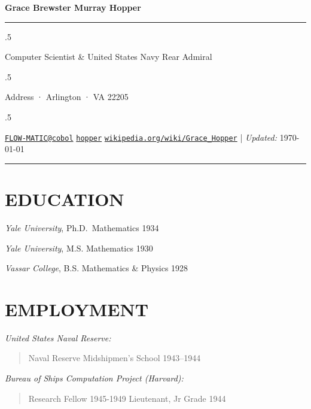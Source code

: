 \documentclass[10pt,]{article}
\begin{document}
\centerline{\huge \bf Grace Brewster Murray Hopper}

\vspace{2 mm}

\hrule

\vspace{2 mm}

\moveleft.5\hoffset\centerline{Computer Scientist \& United States Navy Rear Admiral}
\moveleft.5\hoffset\centerline{Address · Arlington · VA 22205}
\moveleft.5\hoffset\centerline{ \faEnvelopeO \hspace{1 mm} \href{mailto:}{\tt \href{mailto:FLOW-MATIC@cobol}{\nolinkurl{FLOW-MATIC@cobol}}} \hspace{1 mm}  \faGithub \hspace{1 mm} \href{http://github.com/hopper}{\tt hopper} \hspace{1 mm}    \faGlobe \hspace{1 mm} \href{http://wikipedia.org/wiki/Grace\_Hopper}{\tt wikipedia.org/wiki/Grace\_Hopper}    | \emph{Updated:} \today}

\vspace{2 mm}

\hrule


\hypertarget{education}{%
\section{EDUCATION}\label{education}}

\emph{Yale University}, Ph.D.~Mathematics \hfill 1934

\emph{Yale University}, M.S. Mathematics \hfill 1930

\emph{Vassar College}, B.S. Mathematics \& Physics \hfill 1928

\hypertarget{employment}{%
\section{EMPLOYMENT}\label{employment}}

\emph{United States Naval Reserve:}

\begin{quote}
Naval Reserve Midshipmen's School \hfill 1943--1944
\end{quote}

\emph{Bureau of Ships Computation Project (Harvard):}

\begin{quote}
Research Fellow \hfill 1945-1949 Lieutenant, Jr Grade \hfill 1944
\end{quote}
\end{document}
